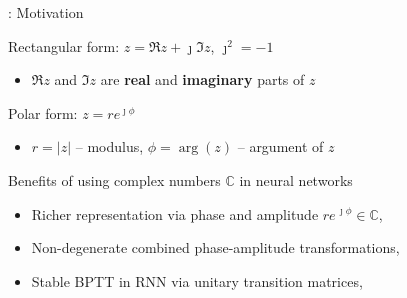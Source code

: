 \documentclass{beamer}
\newcommand{\cplx}{\mathbb{C}}
\newcommand{\iu}{{\jmath}}
\begin{document}
\begin{frame}[c]{\insertsection: Motivation}

  Rectangular form: $z = \Re{z} + \iu \Im{z}$, $\iu^2 = -1$
  \begin{itemize}
    \item $\Re{z}$ and $\Im{z}$ are \textbf{real} and \textbf{imaginary} parts of $z$
  \end{itemize}

  \smallskip
  Polar form: $z = r e^{\iu \phi}$
  \begin{itemize}
    \item $r = \lvert z \rvert$ -- modulus, $\phi = \arg{\!(z)}$ -- argument of $z$
  \end{itemize}

  \pause
  \bigskip
  Benefits of using complex numbers $\cplx$ in neural networks
  \begin{itemize}
    \pause
    \item Richer representation via phase and amplitude $
        r e^{\,\iu \phi} \in \cplx
      $,
      {\tiny \\ \quad
        \citep{reichert_neuronal_2014}}

    \pause
    \smallskip
    \item Non-degenerate combined phase-amplitude transformations,
      {\tiny \\ \quad
        \citep{hirose_generalization_2012}}

    \pause
    \smallskip
    \item Stable BPTT in RNN via unitary transition matrices,
      {\tiny \\ \quad
        \citep{arjovsky_unitary_2016,wisdom_full-capacity_2016}}
  \end{itemize}

\end{frame}
\end{document}
